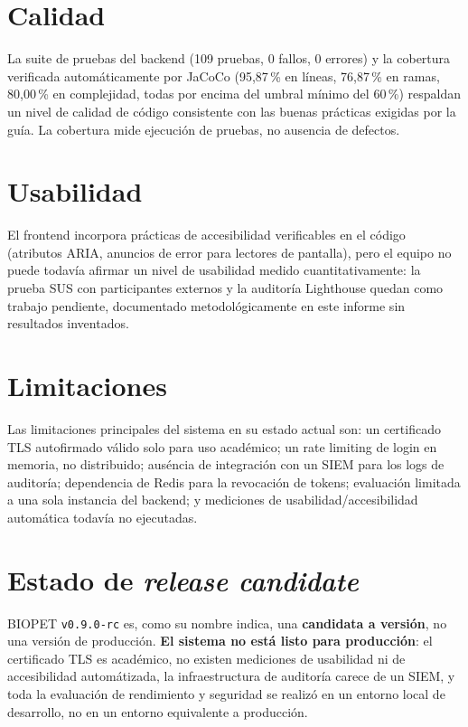 \section{Calidad}
La suite de pruebas del backend (109 pruebas, 0 fallos, 0 errores) y la
cobertura verificada autom\'aticamente por JaCoCo (95{,}87\,\% en l\'ineas,
76{,}87\,\% en ramas, 80{,}00\,\% en complejidad, todas por encima del
umbral m\'inimo del 60\,\%) respaldan un nivel de calidad de c\'odigo
consistente con las buenas pr\'acticas exigidas por la gu\'ia. La cobertura
mide ejecuci\'on de pruebas, no ausencia de defectos.

\section{Usabilidad}
El frontend incorpora pr\'acticas de accesibilidad verificables en el
c\'odigo (atributos ARIA, anuncios de error para lectores de pantalla), pero
el equipo no puede todav\'ia afirmar un nivel de usabilidad medido
cuantitativamente: la prueba SUS con participantes externos y la auditor\'ia
Lighthouse quedan como trabajo pendiente, documentado metodol\'ogicamente
en este informe sin resultados inventados.

\section{Limitaciones}
Las limitaciones principales del sistema en su estado actual son: un
certificado TLS autofirmado v\'alido solo para uso acad\'emico; un rate
limiting de login en memoria, no distribuido; aus\'encia de integraci\'on
con un SIEM para los logs de auditor\'ia; dependencia de Redis para la
revocaci\'on de tokens; evaluaci\'on limitada a una sola instancia del
backend; y mediciones de usabilidad/accesibilidad autom\'atica todav\'ia no
ejecutadas.

\section{Estado de \emph{release candidate}}
BIOPET \texttt{v0.9.0-rc} es, como su nombre indica, una \textbf{candidata
a versi\'on}, no una versi\'on de producci\'on. \textbf{El sistema no est\'a
listo para producci\'on}: el certificado TLS es acad\'emico, no existen
mediciones de usabilidad ni de accesibilidad autom\'atizada, la
infraestructura de auditor\'ia carece de un SIEM, y toda la evaluaci\'on de
rendimiento y seguridad se realiz\'o en un entorno local de desarrollo, no
en un entorno equivalente a producci\'on.

